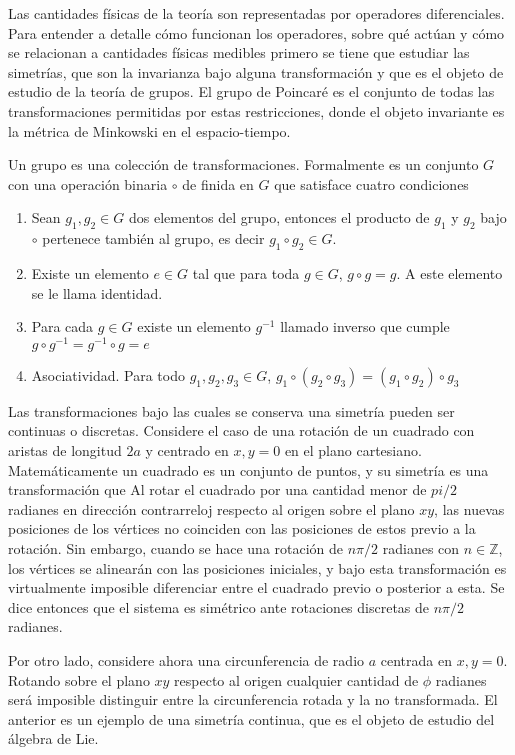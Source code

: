 Las cantidades físicas de la teoría son representadas por operadores diferenciales. Para entender a detalle cómo funcionan los operadores, sobre qué actúan y cómo se relacionan a cantidades físicas medibles primero se tiene que estudiar las simetrías, que son la invarianza bajo alguna transformación y que es el objeto de estudio de la teoría de grupos. El grupo de Poincaré es el conjunto de todas las transformaciones permitidas por estas restricciones, donde el objeto invariante es la métrica de Minkowski en el espacio-tiempo.

Un grupo es una colección de transformaciones. Formalmente es un conjunto $G$ con una operación binaria $\circ$ de finida en $G$ que satisface cuatro condiciones
\begin{enumerate}
  \item Sean $g_1,g_2 \in G$ dos elementos del grupo, entonces el producto de $g_1$ y $g_2$ bajo $\circ$ pertenece también al grupo, es decir $g_1 \circ g_2 \in G$.
  \item Existe un elemento $e\in G$ tal que para toda $g\in G$, $g\circ g = g$. A este elemento se le llama identidad.
  \item Para cada $g\in G$ existe un elemento $g^{-1}$ llamado inverso que cumple $g\circ g^{-1} = g^{-1}\circ g =e$
  \item Asociatividad. Para todo $g_1, g_2, g_3 \in G$, $g_1 \circ (g_2 \circ g_3) = (g_1 \circ g_2) \circ g_3$
\end{enumerate}

Las transformaciones bajo las cuales se conserva una simetría pueden ser continuas o discretas. Considere el caso de una rotación de un cuadrado con aristas de longitud $2a$ y centrado en $x,y=0$ en el plano cartesiano. Matemáticamente un cuadrado es un conjunto de puntos, y su simetría es una transformación que  Al rotar el cuadrado por una cantidad menor de $pi/2$ radianes en dirección contrarreloj respecto al origen sobre el plano $xy$, las nuevas posiciones de los vértices no coinciden con las posiciones de estos previo a la rotación. Sin embargo, cuando se hace una rotación de $n\pi/2$ radianes con $n\in \mathbb{Z}$, los vértices se alinearán con las posiciones iniciales, y bajo esta transformación es virtualmente imposible diferenciar entre el cuadrado previo o posterior a esta. Se dice entonces que el sistema es simétrico ante rotaciones discretas de $n\pi/2$ radianes.

Por otro lado, considere ahora una circunferencia de radio $a$ centrada en $x,y=0$. Rotando sobre el plano $xy$ respecto al origen cualquier cantidad de $\phi$ radianes será imposible distinguir entre la circunferencia rotada y la no transformada. El anterior es un ejemplo de una simetría continua, que es el objeto de estudio del álgebra de Lie.

